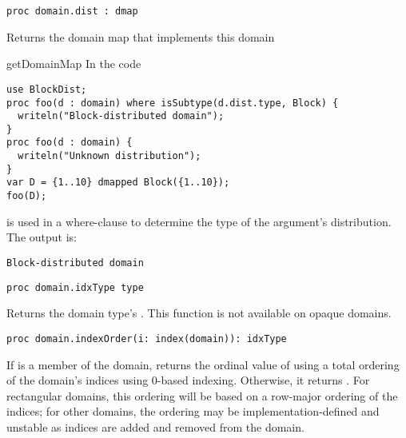 \begin{protohead}
\begin{verbatim}
proc domain.dist : dmap
\end{verbatim}
\end{protohead}
\begin{protobody}
Returns the domain map that implements this domain
\end{protobody}

\begin{chapelexample}{getDomainMap}
In the code
\begin{chapel}
\begin{verbatim}
use BlockDist;
proc foo(d : domain) where isSubtype(d.dist.type, Block) {
  writeln("Block-distributed domain");
}
proc foo(d : domain) {
  writeln("Unknown distribution");
}
var D = {1..10} dmapped Block({1..10});
foo(D);
\end{verbatim}
\end{chapel}
 is used in a where-clause to determine the type of the argument's
distribution. The output is:
\begin{chapelprintoutput}
\begin{verbatim}
Block-distributed domain
\end{verbatim}
\end{chapelprintoutput}
\end{chapelexample}

\begin{protohead}
\begin{verbatim}
proc domain.idxType type
\end{verbatim}
\end{protohead}
\begin{protobody}
Returns the domain type's .
This function is not available on opaque domains.
\end{protobody}

\begin{protohead}
\begin{verbatim}
proc domain.indexOrder(i: index(domain)): idxType
\end{verbatim}
\end{protohead}
\begin{protobody}
If  is a member of the domain, returns the ordinal value of
 using a total ordering of the domain's indices using 0-based
indexing.  Otherwise, it returns .  For rectangular
domains, this ordering will be based on a row-major ordering of the
indices; for other domains, the ordering may be
implementation-defined and unstable as indices are added and
removed from the domain.
\end{protobody}

